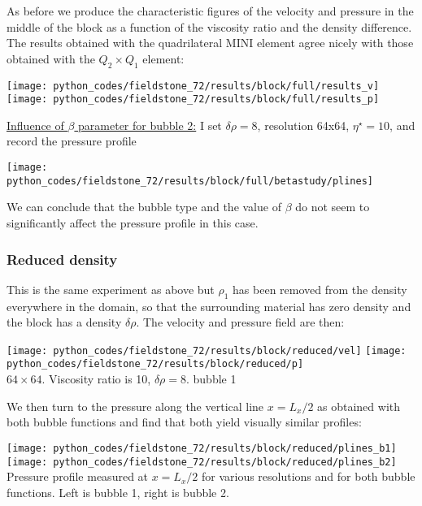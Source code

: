 As before we produce the characteristic figures of the velocity and pressure in the middle of the 
block as a function of the viscosity ratio and the density difference. The results obtained 
with the quadrilateral MINI element agree nicely with those obtained with the $Q_2\times Q_1$ element:
 
\begin{center}
\texttt{[image: python\_codes/fieldstone\_72/results/block/full/results\_v]}
\texttt{[image: python\_codes/fieldstone\_72/results/block/full/results\_p]}
\end{center}


\underline{Influence of $\beta$ parameter for bubble 2:} I set $\delta\rho=8$, resolution 64x64, $\eta^\star=10$,
and record the pressure profile 

\begin{center}
\texttt{[image: python\_codes/fieldstone\_72/results/block/full/betastudy/plines]}
\end{center}

We can conclude that the bubble type and the value of $\beta$ do not seem to significantly affect 
the pressure profile in this case.

\subsubsection*{Reduced density} 
This is the same experiment as above but $\rho_1$ has been removed from the density
everywhere in the domain, so that the surrounding material has zero density 
and the block has a density $\delta \rho$.
The velocity and pressure field are then:

\begin{center}
\texttt{[image: python\_codes/fieldstone\_72/results/block/reduced/vel]}
\texttt{[image: python\_codes/fieldstone\_72/results/block/reduced/p]}\\
{\captionfont $64\times 64$. Viscosity ratio is 10, $\delta \rho=8$. bubble 1}
\end{center}

We then turn to the pressure along the vertical line $x=L_x/2$ as obtained with 
both bubble functions and find that both yield visually similar profiles:

\begin{center}
\texttt{[image: python\_codes/fieldstone\_72/results/block/reduced/plines\_b1]}
\texttt{[image: python\_codes/fieldstone\_72/results/block/reduced/plines\_b2]}\\
{\captionfont Pressure profile measured at $x=L_x/2$ for various resolutions and for both bubble functions.
Left is bubble 1, right is bubble 2.}
\end{center}


